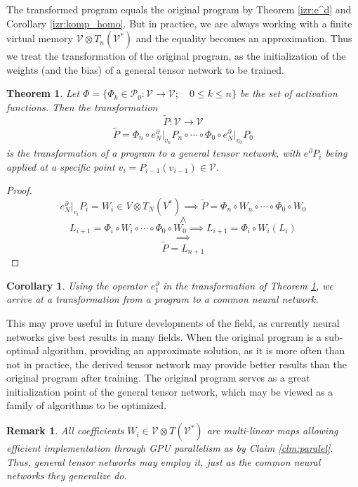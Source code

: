 \documentclass[preprint,12pt]{elsarticle}
\newcommand{\VV}{\mathcal{V}}
\newcommand{\dP}{\mathcal{P}}
\newcommand{\D}{\partial}
\newtheorem{izrek}{Theorem}[section]
\newtheorem{opomba}{Remark}[section]
\newtheorem{corollary}{Corollary}[section]
\begin{document}
The transformed program equals the original program by Theorem \ref{izr:e^d} and Corollary \ref{izr:komp_homo}. But in practice, we are always working with a finite virtual memory $\VV\otimes T_n(\VV^*)$ and the equality becomes an approximation. Thus we treat the transformation of the original program, as the initialization of the weights (and the bias) of a general tensor network to be trained.  

\begin{izrek}\label{izr:transToTensorNet}
Let $\Phi=\{\Phi_k\in\dP_0:\VV\to\VV;\quad 0\le k\le n\}$ be the set of activation functions. Then the transformation
\begin{equation}
\tilde{P}:\VV\to\VV
\end{equation}
\begin{eqnarray}
\tilde{P}=\Phi_n\circ e^\D_N\vert_{v_n}P_n\circ\cdots\circ\Phi_0\circ e^\D_N\vert_{v_0}P_0
\end{eqnarray}
is the transformation of a program to a general tensor network, with $e^\D P_i$ being applied at a specific point $v_{i}=P_{i-1}(v_{i-1})\in \VV$.
\end{izrek}
\begin{proof}
$$e^\D_N\vert_{v_i} P_i=W_i\in V\otimes T_N(V^*)\implies\tilde{P}=\Phi_n\circ W_n\circ\cdots\circ\Phi_0\circ W_0$$
$$\land$$
$$L_{i+1}=\Phi_i\circ W_i\circ\cdots\circ\Phi_0\circ W_0\implies L_{i+1}=\Phi_i\circ W_i(L_i)$$
$$\implies$$
$$\tilde{P}=L_{n+1}$$
\end{proof}

\begin{corollary}
Using the operator $e^ \D_1$ in the transformation of Theorem \ref{izr:transToTensorNet}, we arrive at a transformation from a program to a common neural network.
\end{corollary}

This may prove useful in future developments of the field, as currently neural networks give best results in many fields. When the original program is a sub-optimal algorithm, providing an approximate solution, as it is more often than not in practice, the derived tensor network may provide better results than the original program after training. The original program serves as a great initialization point of the general tensor network, which may be viewed as a family of algorithms to be optimized. 

\begin{opomba}
All coefficients $W_i\in \VV\otimes T(\VV^*)$ are multi-linear maps allowing efficient implementation through GPU parallelism as by Claim \ref{clm:paralel}. Thus, general tensor networks may employ it, just as the common neural networks they generalize do.
\end{opomba}
\end{document}
